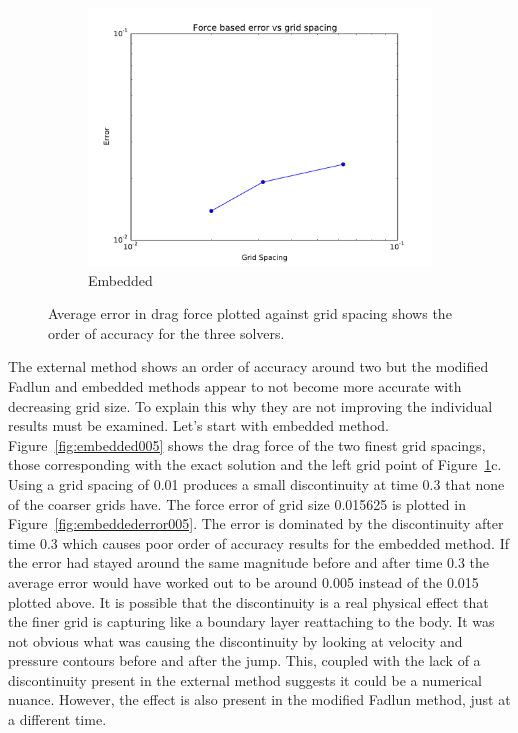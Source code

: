 \begin{figure}[!htb]
\begin{subfigure}{0.3\textwidth}
		\includegraphics[width=\linewidth]{error_embedded}
		\caption{Embedded}
	\end{subfigure}
	\caption{Average error in drag force plotted against grid spacing shows the order of accuracy for the three solvers.}
	\label{fig:cyerror}
\end{figure}

The external method shows an order of accuracy around two but the modified Fadlun and embedded methods appear to not become more accurate with decreasing grid size. 
To explain this why they are not improving the individual results must be examined. 
Let's start with embedded method. 
Figure~\ref{fig:embedded005} shows the drag force of the two finest grid spacings, those corresponding with the exact solution and the left grid point of Figure~\ref{fig:cyerror}c. 
Using a grid spacing of 0.01 produces a small discontinuity at time 0.3 that none of the coarser grids have. 
The force error of grid size 0.015625 is plotted in Figure~\ref{fig:embeddederror005}. 
The error is dominated by the discontinuity after time 0.3 which causes poor order of accuracy results for the embedded method. 
If the error had stayed around the same magnitude before and after time 0.3 the average error would have worked out to be around 0.005 instead of the 0.015 plotted above. 
It is possible that the discontinuity is a real physical effect that the finer grid is capturing like a boundary layer reattaching to the body. 
It was not obvious what was causing the discontinuity by looking at velocity and pressure contours before and after the jump. 
This, coupled with the lack of a discontinuity present in the external method suggests it could be a numerical nuance. 
However, the effect is also present in the modified Fadlun method, just at a different time.

